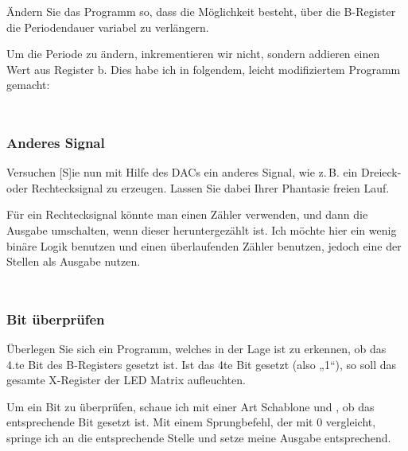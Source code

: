 \begin{problem}
	Ändern Sie das Programm so, dass die Möglichkeit besteht, über die
	B-Register die Periodendauer variabel zu verlängern.
\end{problem}

Um die Periode zu ändern, inkrementieren wir nicht, sondern addieren einen Wert
aus Register b. Dies habe ich in folgendem, leicht modifiziertem Programm
gemacht:

\inputminted[fontsize=\small, linenos]{cpp}{../Prototypen/d.cpp}

\begin{multicols}{9}
	\inputminted[fontsize=\footnotesize]{text}{d.txt}
\end{multicols}

\subsubsection{Anderes Signal}

\begin{problem}
	Versuchen [S]ie nun mit Hilfe des DACs ein anderes Signal, wie z.\,B. ein
	Dreieck- oder Rechtecksignal zu erzeugen. Lassen Sie dabei Ihrer Phantasie
	freien Lauf.
\end{problem}

Für ein Rechtecksignal könnte man einen Zähler verwenden, und dann die Ausgabe
umschalten, wenn dieser heruntergezählt ist. Ich möchte hier ein wenig binäre
Logik benutzen und einen überlaufenden Zähler benutzen, jedoch eine der Stellen
als Ausgabe nutzen.

\inputminted[fontsize=\small, linenos]{cpp}{../Prototypen/e.cpp}

\begin{multicols}{9}
	\inputminted[fontsize=\footnotesize]{text}{e.txt}
\end{multicols}

\subsubsection{Bit überprüfen}

\begin{problem}
	Überlegen Sie sich ein Programm, welches in der Lage ist zu erkennen, ob
	das 4.te Bit des B-Registers gesetzt ist. Ist das 4te Bit gesetzt (also
	„1“), so soll das gesamte X-Register der LED Matrix aufleuchten.
\end{problem}

Um ein Bit zu überprüfen, schaue ich mit einer Art Schablone und \txor, ob das
entsprechende Bit gesetzt ist. Mit einem Sprungbefehl, der mit 0 vergleicht,
springe ich an die entsprechende Stelle und setze meine Ausgabe entsprechend.

